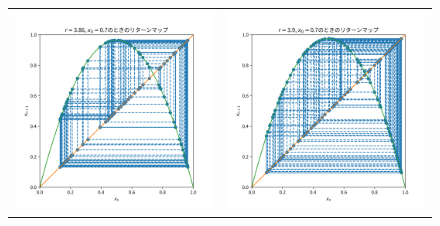 \begin{figure}[htbp]
\begin{tabular}{cc}
    \begin{minipage}[t]{0.45\hsize}
      \centering
      \includegraphics[keepaspectratio, scale=0.3]{images/Problem1/ctest2_5_2.png}
    \end{minipage} &
    \begin{minipage}[t]{0.45\hsize}
      \centering
      \includegraphics[keepaspectratio, scale=0.3]{images/Problem1/ctest2_6_2.png}
    \end{minipage}
  \end{tabular}
\end{figure}


